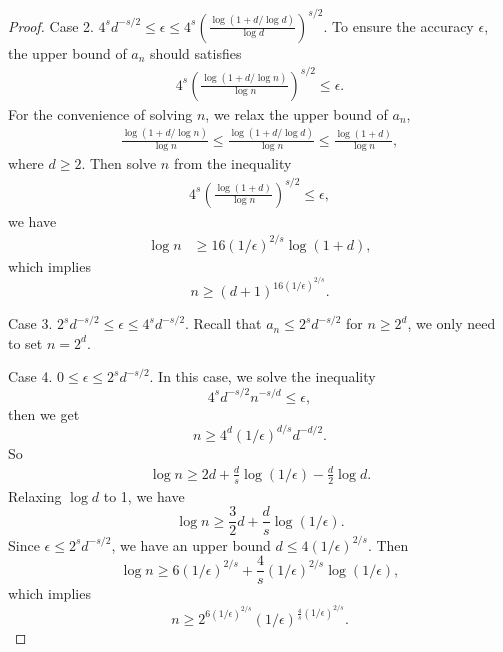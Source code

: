 \documentclass{article}
\theoremstyle{plain}
\theoremstyle{definition}
\theoremstyle{remark}
\begin{document}
\begin{proof}
    Case 2. $4^s d^{-s/2} \leq \epsilon \leq 4^s \left(\frac{\log (1+d/\log d)}{\log d}\right)^{s/2}$. To ensure the accuracy $\epsilon$, the upper bound of $a_n$ should satisfies
    \begin{align*}
        4^s\left(\frac{\log (1+d/\log n)}{\log n}\right)^{s/2} \leq \epsilon.
    \end{align*}
    For the convenience of solving $n$, we relax the upper bound of $a_n$,
    \begin{align*}
        \frac{\log (1+d/\log n)}{\log n} \leq \frac{\log (1+d/\log d)}{\log n} \leq \frac{\log (1+d)}{\log n},
    \end{align*}
    where $d \geq 2$. Then solve $n$ from the inequality
    \begin{align*}
        4^s\left(\frac{\log (1+d)}{\log n}\right)^{s/2} \leq \epsilon,
    \end{align*}
    we have
    \begin{align*}
        \log n &\geq 16 (1/\epsilon)^{2/s} \log(1+d), 
    \end{align*}
    which implies
    \begin{equation*}
        n \geq (d+1)^{16(1/\epsilon)^{2/s}}.
    \end{equation*}
    
    Case 3. $2^s d^{-s/2} \leq \epsilon \leq 4^s d^{-s/2}$. Recall that $a_n \leq 2^s d^{-s/2}$ for $n \geq 2^d$, we only need to set $n=2^d$.

    Case 4. $0 \leq \epsilon \leq 2^s d^{-s/2}$. In this case, we solve the inequality
    \begin{equation*}
        4^s d^{-s/2} n^{-s/d} \leq \epsilon,
    \end{equation*}
    then we get
    \begin{equation*}
        n \geq 4^d(1/\epsilon)^{d/s}d^{-d/2}.
    \end{equation*}
    So 
    \begin{align*}
        \log n \geq 2d +\frac{d}{s}\log (1/\epsilon) -\frac{d}{2}\log d.
    \end{align*}
    Relaxing $\log d$ to 1, we have
    \begin{equation*}
        \log n \geq \frac{3}{2}d +\frac{d}{s}\log (1/\epsilon).
    \end{equation*}
    Since $\epsilon \leq 2^s d^{-s/2}$, we have an upper bound $d \leq 4(1/\epsilon)^{2/s}$. Then
    \begin{equation*}
        \log n \geq 6(1/\epsilon)^{2/s} + \frac{4}{s}(1/\epsilon)^{2/s}\log (1/\epsilon),
    \end{equation*}
    which implies
    \begin{equation*}
        n \geq 2^{6(1/\epsilon)^{2/s}} (1/\epsilon)^{\frac{4}{s}(1/\epsilon)^{2/s}}.
    \end{equation*}


\end{proof}
\end{document}
